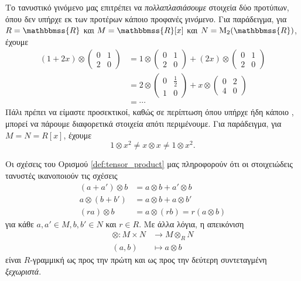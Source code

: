 \documentclass[12pt,a4paper,reqno]{amsart}
\theoremstyle{definition}
\theoremstyle{remark}
\numberwithin{theorem}{section}
\numberwithin{exercise}{section}
\numberwithin{equation}{section}
\newcommand{\RR}{\mathbbmss{R}}
\newcommand{\rmM}{\mathrm{M}}
\renewcommand{\to}{\rightarrow}
\begin{document}
Το τανυστικό γινόμενο μας επιτρέπει να \emph{πολλαπλασιάσουμε} στοιχεία δύο προτύπων, όπου δεν υπήρχε εκ των προτέρων κάποιο προφανές \emph{γινόμενο}. Για παράδειγμα, για $R = \RR$ και $M = \RR[x]$ και $N = \rmM_2(\RR)$, έχουμε 
\begin{align*}
    (1+2x) \otimes \begin{pmatrix}
        0 & 1 \\ 2 & 0
    \end{pmatrix} &= 
    1 \otimes \begin{pmatrix}
        0 & 1 \\ 2 & 0
    \end{pmatrix} + (2x) \otimes \begin{pmatrix}
        0 & 1 \\ 2 & 0
    \end{pmatrix} \\ 
    &= 2 \otimes \begin{pmatrix}
        0 & \frac{1}{2} \\ 1 & 0 
    \end{pmatrix} + 
    x \otimes \begin{pmatrix}
        0 & 2 \\ 4 & 0
    \end{pmatrix} \\ 
    &= \cdots 
\end{align*}
Πάλι πρέπει να είμαστε προσεκτικοί, καθώς σε περίπτωση όπου υπήρχε ήδη κάποιο , μπορεί να πάρουμε διαφορετικά στοιχεία απότι περιμένουμε. Για παράδειγμα, για $M = N = R[x]$, έχουμε 
\[
1 \otimes x^2 \neq x \otimes x \neq 1 \otimes x^2.
\] 

Οι σχέσεις του Ορισμού \ref{def:tensor_product} μας πληροφορούν ότι οι στοιχειώδεις τανυστές ικανοποιούν τις σχέσεις
\begin{align*}
    (a + a') \otimes b &= a \otimes b + a' \otimes b \\
    a \otimes (b + b') &= a \otimes b + a \otimes b' \\
    (ra) \otimes b &= a \otimes (rb) = r (a \otimes b)
\end{align*}
για κάθε $a, a' \in M, b, b' \in N$ και $r \in R$. Με άλλα λόγια, η απεικόνιση 
\begin{align*}
    \otimes : M \times N &\to M \otimes_R N \\ 
              (a,b) &\mapsto a \otimes b
\end{align*}
είναι $R$-γραμμική ως προς την πρώτη και ως προς την δεύτερη συντεταγμένη \emph{ξεχωριστά}.
\end{document}
